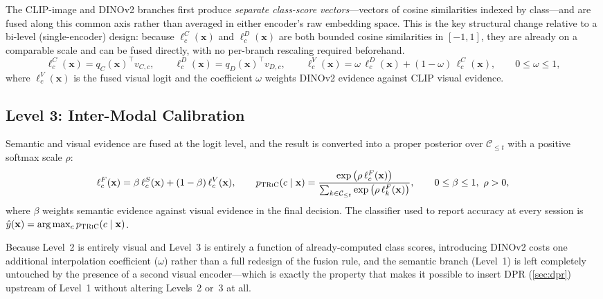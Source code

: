 \documentclass{iutbscthesis}
\begin{document}
The CLIP-image and DINOv2 branches first produce \emph{separate class-score vectors}---vectors of cosine similarities indexed by class---and are fused along this common axis rather than averaged in either encoder's raw embedding space. This is the key structural change relative to a bi-level (single-encoder) design: because $\ell^C_c(\mathbf{x})$ and $\ell^D_c(\mathbf{x})$ are both bounded cosine similarities in $[-1,1]$, they are already on a comparable scale and can be fused directly, with no per-branch rescaling required beforehand.
\begin{equation}
    \ell^C_c(\mathbf{x}) = q_C(\mathbf{x})^\top v_{C,c}, \qquad
    \ell^D_c(\mathbf{x}) = q_D(\mathbf{x})^\top v_{D,c}, \qquad
    \ell^V_c(\mathbf{x}) = \omega\, \ell^D_c(\mathbf{x}) + (1-\omega)\, \ell^C_c(\mathbf{x}), \qquad 0 \le \omega \le 1,
    \label{eq:level2}
\end{equation}
where $\ell^V_c(\mathbf{x})$ is the fused visual logit and the coefficient $\omega$ weights DINOv2 evidence against CLIP visual evidence.

\subsection{Level 3: Inter-Modal Calibration}

Semantic and visual evidence are fused at the logit level, and the result is converted into a proper posterior over $\mathcal{C}_{\le t}$ with a positive softmax scale $\rho$:
\begin{equation}
    \ell^F_c(\mathbf{x}) = \beta\, \ell^S_c(\mathbf{x}) + (1-\beta)\, \ell^V_c(\mathbf{x}), \qquad
    p_{\textsc{TRiC}}(c \mid \mathbf{x}) = \frac{\exp\big(\rho\, \ell^F_c(\mathbf{x})\big)}{\sum_{k \in \mathcal{C}_{\le t}} \exp\big(\rho\, \ell^F_k(\mathbf{x})\big)}, \qquad 0 \le \beta \le 1,\ \rho > 0,
    \label{eq:level3}
\end{equation}
where $\beta$ weights semantic evidence against visual evidence in the final decision. The classifier used to report accuracy at every session is $\hat y(\mathbf{x}) = \arg\max_{c} p_{\textsc{TRiC}}(c \mid \mathbf{x})$.

Because Level~2 is entirely visual and Level~3 is entirely a function of already-computed class scores, introducing DINOv2 costs one additional interpolation coefficient ($\omega$) rather than a full redesign of the fusion rule, and the semantic branch (Level~1) is left completely untouched by the presence of a second visual encoder---which is exactly the property that makes it possible to insert DPR (\autoref{sec:dpr}) upstream of Level~1 without altering Levels~2 or~3 at all.
\end{document}
